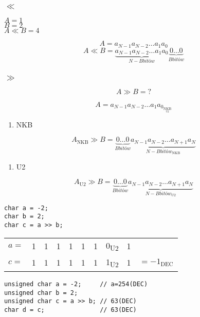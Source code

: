 \documentclass[11pt]{article}
\begin{document}
\subsubsection{\(\ll\)}
\label{sec:org2cc7a2c}

\(A=1\) \\
\(B=2\) \\
\(A \ll B = 4\)

$$A= a_{N-1} a_{N-2} \dots a_1 a_0 $$
$$A \ll B = \underbrace{a_{N-1} a_{N-2} \dots a_1 a_0}_{N-B \textit{bitów}} \underbrace{0 \dots 0}_{B \textit{bitów}}$$

\subsubsection{\(\gg\)}
\label{sec:orga1d8c77}

$$A \gg B = ?$$

$$A= a_{N-1} a_{N-2} \dots a_1 a_0 _{\underset{\text{U2}}{\text{NKB}}} $$
\begin{enumerate}
\item NKB
\end{enumerate}
$$A_{\text{NKB}} \gg B = \underbrace{0 \dots 0}_{B \textit{bitów}} \underbrace{a_{N-1} a_{N-2} \dots a_{N+1} a_{N}}_{ {N-B} \textit{bitów}} _\text{NKB} $$

\begin{enumerate}
\item U2
\end{enumerate}
$$A_{\text{U2}} \gg B = \underbrace{0 \dots 0}_{B \textit{bitów}} \underbrace{a_{N-1} a_{N-2} \dots a_{N+1} a_{N}}_{ {N-B} \textit{bitów}} _\text{U2} $$

\hline

\begin{verbatim}
char a = -2;
char b = 2;
char c = a >> b;
\end{verbatim}
\begin{center}
\begin{tabular}{lrrrrrrlrl}
\(a =\) & 1 & 1 & 1 & 1 & 1 & 1 & 0\textsubscript{U2} & 1 & \\
\(c =\) & 1 & 1 & 1 & 1 & 1 & 1 & 1\textsubscript{U2} & 1 & \(= -1_{\text{DEC}}\)\\
\end{tabular}
\end{center}

\hline
\begin{verbatim}
unsigned char a = -2;     // a=254(DEC)
unsigned char b = 2;
unsigned char c = a >> b; // 63(DEC)
char d = c;               // 63(DEC)
\end{verbatim}
\end{document}
